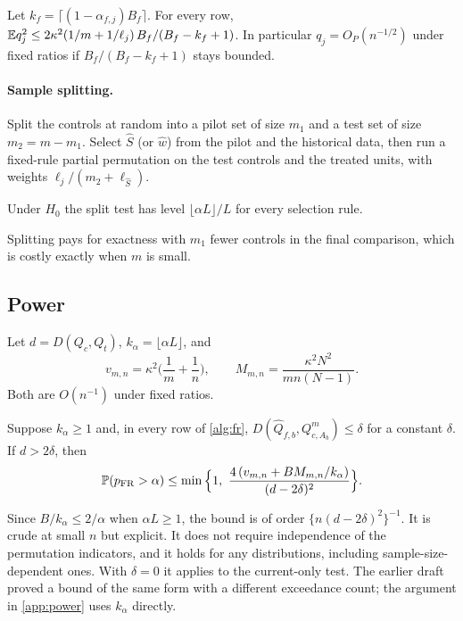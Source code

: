 \documentclass[11pt,a4paper]{article}
\begin{document}
\begin{lemma}\label{lem:q}
Let $k_f=\lceil(1-\alpha_{f,j})B_f\rceil$. For every row, $\mathbb{E} q_j^2\le 2\kappa^2(1/m+1/\ell_j)\,B_f/(B_f-k_f+1)$. In particular $q_j=O_P(n^{-1/2})$ under fixed ratios if $B_f/(B_f-k_f+1)$ stays bounded.
\end{lemma}

\paragraph{Sample splitting.} Split the controls at random into a pilot set of size $m_1$ and a test set of size $m_2=m-m_1$. Select $\hat S$ (or $\hat w$) from the pilot and the historical data, then run a fixed-rule partial permutation on the test controls and the treated units, with weights $\ell_j/(m_2+\ell_{\hat S})$.

\begin{proposition}\label{prop:split}
Under $H_0$ the split test has level $\lfloor\alpha L\rfloor/L$ for every selection rule.
\end{proposition}

Splitting pays for exactness with $m_1$ fewer controls in the final comparison, which is costly exactly when $m$ is small.

\subsection{Power}\label{sec:power}

Let $d=D(Q_c,Q_t)$, $k_\alpha=\lfloor\alpha L\rfloor$, and
\[
v_{m,n}=\kappa^2\Big(\frac1m+\frac1n\Big),\qquad M_{m,n}=\frac{\kappa^2N^2}{mn(N-1)} .
\]
Both are $O(n^{-1})$ under fixed ratios.

\begin{theorem}\label{thm:typeII}
Suppose $k_\alpha\ge1$ and, in every row of \cref{alg:fr}, $D(\hat Q_{f,b},Q^m_{c,A_b})\le\delta$ for a constant $\delta$. If $d>2\delta$, then
\[
\P(p_{\rm FR}>\alpha)\le\min\Big\{1,\ \frac{4\,(v_{m,n}+BM_{m,n}/k_\alpha)}{(d-2\delta)^2}\Big\}.
\]
\end{theorem}

Since $B/k_\alpha\le 2/\alpha$ when $\alpha L\ge1$, the bound is of order $\{n(d-2\delta)^2\}^{-1}$. It is crude at small $n$ but explicit. It does not require independence of the permutation indicators, and it holds for any distributions, including sample-size-dependent ones. With $\delta=0$ it applies to the current-only test. The earlier draft proved a bound of the same form with a different exceedance count; the argument in \cref{app:power} uses $k_\alpha$ directly.
\end{document}
